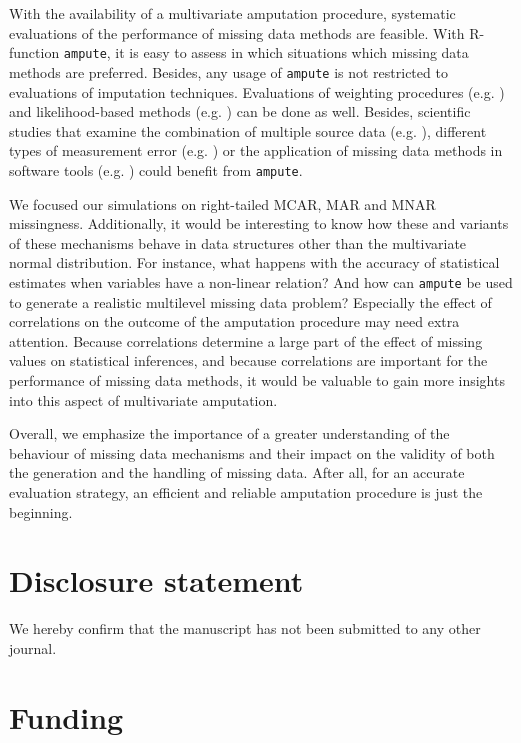 \documentclass[]{interact}
\newcommand{\code}[1]{\texttt{#1}}
\begin{document}
With the availability of a multivariate amputation procedure, systematic evaluations of the performance of missing data methods are feasible. With R-function \code{ampute}, it is easy to assess in which situations which missing data methods are preferred. Besides, any usage of \code{ampute} is not restricted to evaluations of imputation techniques. Evaluations of weighting procedures (e.g. \citep{Boeschoten2017}) and likelihood-based methods (e.g. \citep{Little2002, Molenberghs2007}) can be done as well. Besides, scientific studies that examine the combination of multiple source data (e.g. \citep{Waal2017}), different types of measurement error (e.g. \citep{Waal2016}) or the application of missing data methods in software tools (e.g. \citep{Horton}) could benefit from \code{ampute}.

We focused our simulations on right-tailed MCAR, MAR and MNAR missingness. Additionally, it would be interesting to know how these and variants of these mechanisms behave in data structures other than the multivariate normal distribution. For instance, what happens with the accuracy of statistical estimates when variables have a non-linear relation? And how can \code{ampute} be used to generate a realistic multilevel missing data problem? Especially the effect of correlations on the outcome of the amputation procedure may need extra attention. Because correlations determine a large part of the effect of missing values on statistical inferences, and because correlations are important for the performance of missing data methods, it would be valuable to gain more insights into this aspect of multivariate amputation. 

Overall, we emphasize the importance of a greater understanding of the behaviour of missing data mechanisms and their impact on the validity of both the generation and the handling of missing data. After all, for an accurate evaluation strategy, an efficient and reliable amputation procedure is just the beginning. 

\section*{Disclosure statement}

We hereby confirm that the manuscript has not been submitted to any other journal.

\section*{Funding}
\end{document}
